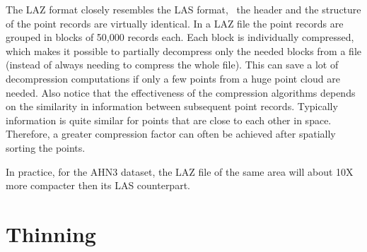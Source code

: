 The LAZ format closely resembles the LAS format, \ie\ the header and the structure of the point records are virtually identical.
In a LAZ file the point records are grouped in blocks of 50,000 records each.
Each block is individually compressed, which makes it possible to partially decompress only the needed blocks from a file (instead of always needing to compress the whole file).
This can save a lot of decompression computations if only a few points from a huge point cloud are needed.
Also notice that the effectiveness of the compression algorithms depends on the similarity in information between subsequent point records.
Typically information is quite similar for points that are close to each other in space.
Therefore, a greater compression factor can often be achieved after spatially sorting the points.

In practice, for the AHN3 dataset, the LAZ file of the same area will about 10X more compacter then its LAS counterpart.



%
\section{Thinning}

